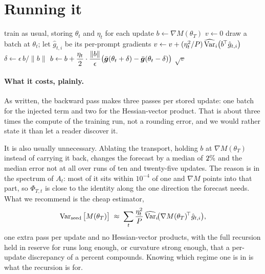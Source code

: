 \section{Running it}
\label{sec:estimation}

\begin{algorithm}[t]
\caption{The forecast, as a trainer would run it}
\label{alg:forecast}
\small
\begin{algorithmic}[1]
  \State train as usual, storing $\theta_t$ and $\eta_t$ for each update
  \State $b \gets \nabla M(\theta_T)$ 
  \State $v \gets 0$
    \State draw a batch at $\theta_t$; let $\hat{g}_{t,i}$ be its per-prompt gradients
    \State $v \gets v + (\eta_t^2/P)\,\widehat{\operatorname{Var}}_i\big(b^{\!\top}\hat{g}_{t,i}\big)$
      \State $\delta \gets \epsilon\, b/\|b\|$
      \State $b \gets b + \dfrac{\eta_t}{2}\cdot\dfrac{\|b\|}{\epsilon}
        \big(\bar{\bm{g}}(\theta_t + \delta) - \bar{\bm{g}}(\theta_t - \delta)\big)$
    \EndIf
  \EndFor
  \State \Return $\sqrt{v}$
\end{algorithmic}
\end{algorithm}

\paragraph{What it costs, plainly.} As written, the backward pass makes three passes per stored
update: one batch for the injected term and two for the Hessian-vector product. That is about three
times the compute of the training run, not a rounding error, and we would rather state it than let
a reader discover it.

It is also usually unnecessary. Ablating the transport, holding $b$ at $\nabla M(\theta_T)$ instead
of carrying it back, changes the forecast by a median of $2\%$ and the median error not at all over
runs of ten and twenty-five updates. The reason is in the spectrum of $A_t$: most of it sits within
$10^{-4}$ of one and $\nabla M$ points into that part, so $\Phi_{T,t}$ is close to the identity
along the one direction the forecast needs. What we recommend is the cheap estimator,
\begin{equation}
  \label{eq:cheap}
  \operatorname{Var}_{\text{seed}}\big[M(\theta_T)\big] \;\approx\;
  \sum_{t} \frac{\eta_t^2}{P}\,\widehat{\operatorname{Var}}_i\!\big(\nabla M(\theta_T)^{\!\top}\hat{g}_{t,i}\big),
\end{equation}
one extra pass per update and no Hessian-vector products, with the full recursion held in reserve
for runs long enough, or curvature strong enough, that a per-update discrepancy of a percent
compounds. Knowing which regime one is in is what the recursion is for.

